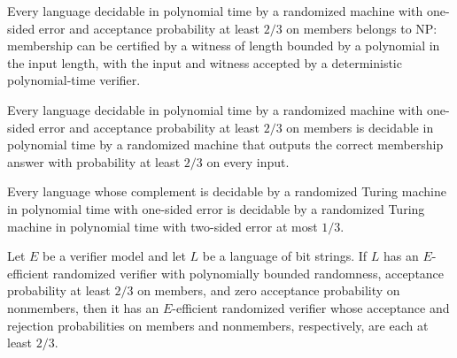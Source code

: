 \begin{theorem}
\label{Randomized.RP_PTM_subset_NP}
\leanok
{}
Every language decidable in polynomial time by a randomized machine with one-sided error
and acceptance probability at least $2/3$ on members belongs to NP: membership can be
certified by a witness of length bounded by a polynomial in the input length, with the
input and witness accepted by a deterministic polynomial-time verifier.
\end{theorem}

\begin{theorem}
\label{Randomized.RP_PTM_subset_BPP_PTM}
\leanok
{}
Every language decidable in polynomial time by a randomized machine with one-sided error
and acceptance probability at least $2/3$ on members is decidable in polynomial time by
a randomized machine that outputs the correct membership answer with probability at
least $2/3$ on every input.
\end{theorem}

\begin{theorem}
\label{Randomized.coRP_PTM_subset_BPP_PTM}
\leanok
{}
Every language whose complement is decidable by a randomized Turing machine in
polynomial time with one-sided error is decidable by a randomized Turing machine in
polynomial time with two-sided error at most $1/3$.
\end{theorem}

\begin{theorem}
\label{Randomized.InRP.inBPP}
\leanok
{}
Let $E$ be a verifier model and let $L$ be a language of bit strings. If $L$ has an
$E$-efficient randomized verifier with polynomially bounded randomness, acceptance
probability at least $2/3$ on members, and zero acceptance probability on nonmembers,
then it has an $E$-efficient randomized verifier whose acceptance and rejection
probabilities on members and nonmembers, respectively, are each at least $2/3$.
\end{theorem}

